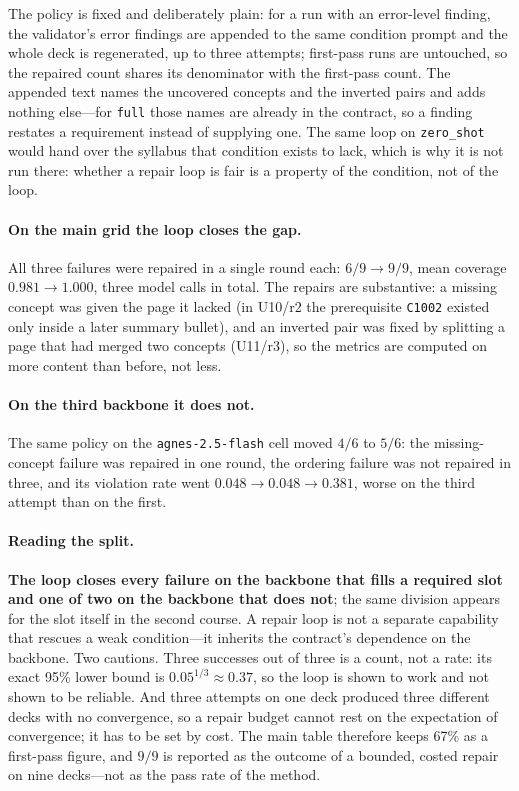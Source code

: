 \documentclass[11pt,a4paper]{article}
\newcommand{\id}[1]{\texttt{#1}}
\begin{document}
The policy is fixed and deliberately plain: for a run with an error-level
finding, the validator's error findings are appended to the same condition
prompt and the whole deck is regenerated, up to three attempts; first-pass runs
are untouched, so the repaired count shares its denominator with the first-pass
count. The appended text names the uncovered concepts and the inverted pairs and
adds nothing else---for \id{full} those names are already in the contract, so a
finding restates a requirement instead of supplying one. The same loop on
\id{zero\_shot} would hand over the syllabus that condition exists to lack, which
is why it is not run there: whether a repair loop is fair is a property of the
condition, not of the loop.

\paragraph{On the main grid the loop closes the gap.} All three failures were
repaired in a single round each: $6/9 \to 9/9$, mean coverage $0.981 \to 1.000$,
three model calls in total. The repairs are substantive: a missing concept was
given the page it lacked (in U10/r2 the prerequisite \id{C1002} existed only
inside a later summary bullet), and an inverted pair was fixed by splitting a
page that had merged two concepts (U11/r3), so the metrics are computed on more
content than before, not less.

\paragraph{On the third backbone it does not.} The same policy on the
\id{agnes-2.5-flash} cell moved $4/6$ to $5/6$: the missing-concept failure was
repaired in one round, the ordering failure was not repaired in three, and its
violation rate went $0.048 \to 0.048 \to 0.381$, worse on the third attempt than
on the first.

\paragraph{Reading the split.} \textbf{The loop closes every failure on the
backbone that fills a required slot and one of two on the backbone that does
not}; the same division appears for the slot itself in the second course. A
repair loop is not a separate capability that rescues a weak condition---it
inherits the contract's dependence on the backbone. Two cautions. Three successes
out of three is a count, not a rate: its exact 95\% lower bound is
$0.05^{1/3} \approx 0.37$, so the loop is shown to work and not shown to be
reliable. And three attempts on one deck produced three different decks with no
convergence, so a repair budget cannot rest on the expectation of convergence; it
has to be set by cost. The main table therefore keeps 67\% as a first-pass
figure, and $9/9$ is reported as the outcome of a bounded, costed repair on nine
decks---not as the pass rate of the method.
\end{document}
